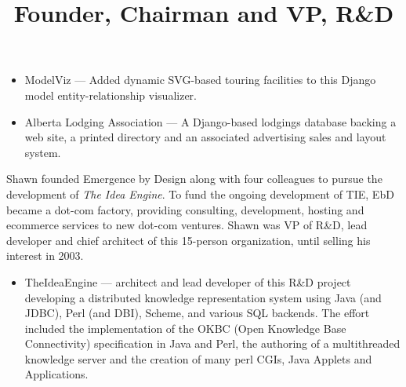 \documentclass[line,margin]{res}
\begin{document}
\begin{resume}
\begin{position}
\begin{itemize}
  \item ModelViz --- Added dynamic SVG-based touring facilities to this Django
  model entity-relationship visualizer.

  \item Alberta Lodging Association --- A Django-based lodgings database 
  backing a web site, a printed directory and an associated advertising 
  sales and layout system.

\end{itemize}

\end{position}




\title{ Founder, Chairman and VP, R\&D }

\begin{position}
  Shawn founded Emergence by Design along with four colleagues to pursue
  the development of \emph{The Idea Engine}.  To fund the ongoing development of
  TIE, EbD became a dot-com factory, providing consulting,
  development, hosting and ecommerce services to new dot-com ventures.
  Shawn was VP of R\&D, lead developer and chief architect of this 15-person
  organization, until selling his interest in 2003.

\begin{itemize}

\item TheIdeaEngine --- architect and lead developer of this R\&D project 
  developing a distributed knowledge representation system using 
  Java (and JDBC), Perl (and DBI), Scheme, and various SQL backends.  
  The effort included the
  implementation of the OKBC (Open Knowledge Base Connectivity)
  specification in Java and Perl,
  the authoring of a multithreaded knowledge server
  and the creation of many perl CGIs, Java Applets and Applications.


\end{itemize}
\end{position}
\end{resume}
\end{document}
